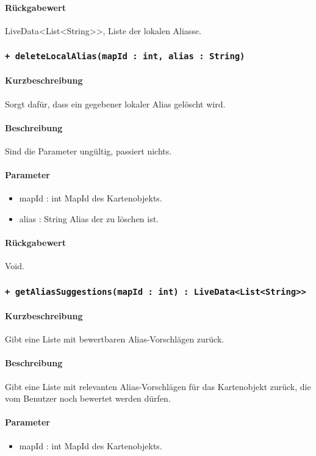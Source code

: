 \paragraph*{Rückgabewert}
LiveData<List<String>>, Liste der lokalen Aliasse.

\subsubsection*{\texttt{+ deleteLocalAlias(mapId : int, alias : String)}}%
\paragraph*{Kurzbeschreibung}
Sorgt dafür, dass ein gegebener lokaler Alias gelöscht wird.
\paragraph*{Beschreibung}
Sind die Parameter ungültig, passiert nichts.
\paragraph*{Parameter}
\begin{itemize}
    \item mapId : int MapId des Kartenobjekts.
    \item alias : String Alias der zu löschen ist.
\end{itemize}
\paragraph*{Rückgabewert}
Void.

\subsubsection*{\texttt{+ getAliasSuggestions(mapId : int) : LiveData<List<String>>}}%
\paragraph*{Kurzbeschreibung}
Gibt eine Liste mit bewertbaren Alias-Vorschlägen zurück.
\paragraph*{Beschreibung}
Gibt eine Liste mit relevanten Alias-Vorschlägen für das Kartenobjekt zurück, 
die vom Benutzer noch bewertet werden dürfen.
\paragraph*{Parameter}
\begin{itemize}
    \item mapId : int MapId des Kartenobjekts.
\end{itemize}
